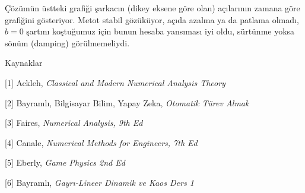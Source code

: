 \documentclass[12pt,fleqn]{article}\usepackage{../../common}
\begin{document}
Çözümün üstteki grafiği şarkacın (dikey eksene göre olan) açılarının zamana göre
grafiğini gösteriyor. Metot stabil gözüküyor, açıda azalma ya da patlama olmadı,
$b=0$ şartını koştuğumuz için bunun hesaba yansıması iyi oldu, sürtünme yoksa
sönüm (damping) görülmemeliydi. 

Kaynaklar

[1] Ackleh, {\em Classical and Modern Numerical Analysis Theory}

[2] Bayramlı, Bilgisayar Bilim, Yapay Zeka, {\em Otomatik Türev Almak}

[3] Faires, {\em Numerical Analysis, 9th Ed}

[4] Canale, {\em Numerical Methods for Engineers, 7th Ed}

[5] Eberly, {\em Game Physics 2nd Ed}

[6] Bayramlı, {\em Gayrı-Lineer Dinamik ve Kaos Ders 1}
\end{document}
